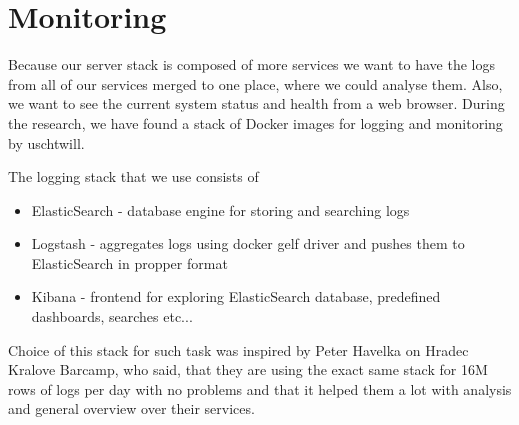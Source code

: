 \section{Monitoring}
Because our server stack is composed of more services we want to have the logs from all of our services merged to one place, where we could analyse them. Also, we want to see the current system status and health from a web browser. During the research, we have found a stack of Docker images for logging and monitoring by uschtwill. 

The logging stack that we use consists of 
\begin{itemize}
	\item ElasticSearch - database engine for storing and searching logs
	\item Logstash - aggregates logs using docker gelf driver and pushes them to ElasticSearch in propper format
	\item Kibana - frontend for exploring ElasticSearch database, predefined dashboards, searches etc...
\end{itemize}

Choice of this stack for such task was inspired by Peter Havelka on Hradec Kralove Barcamp, who said, that they are using the exact same stack for 16M rows of logs per day with no problems and that it helped them a lot with analysis and general overview over their services. \cite{docker_elk_useability}


